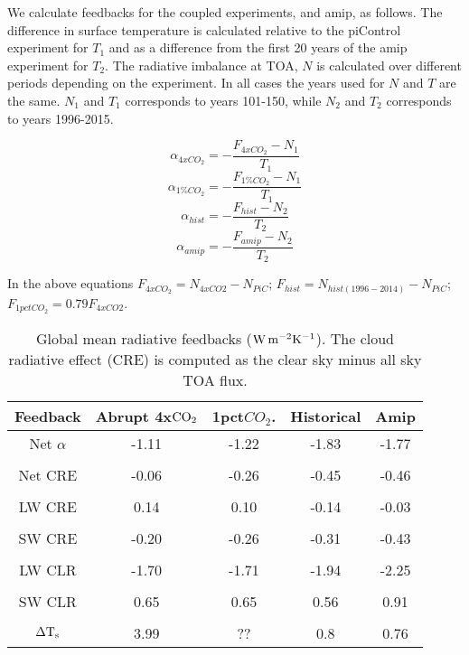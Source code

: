 \documentclass[draft]{agujournal2019}
\begin{document}
We calculate feedbacks for the coupled experiments, and amip, as follows.     The difference in surface temperature is calculated 
relative to the piControl experiment for $T_1$ and as a difference from the first 20 years of the amip experiment for $T_2$.   
The radiative imbalance at TOA, $N$ is calculated over different periods depending on the experiment.  In all cases
the years used for $N$ and $T$ are the same.  $N_1$ and $T_1$ corresponds to years 101-150, while $N_2$ and $T_2$ corresponds
to years 1996-2015.     

\begin{equation}
  \alpha_{4xCO_2}=-\frac{F_{4xCO_2}-N_1}{T_1}
\end{equation}
\begin{equation}
  \alpha_{1\%CO_2}=-\frac{F_{1\%CO_2}-N_1}{T_1}
\end{equation}
\begin{equation}
  \alpha_{hist}=-\frac{F_{hist}-N_2}{T_2}
\end{equation}
\begin{equation}
  \alpha_{amip}=-\frac{F_{amip}-N_2}{T_2}
\end{equation}

In the above equations $F_{4xCO_2}=N_{4xCO2}-N_{PiC}$; $F_{hist}=N_{hist(1996-2014)}-N_{PiC}$; 
$F_{1pctCO_2}=0.79F_{4xCO2}$.

\begin{table}
\begin{center}
\caption{Global mean radiative feedbacks ($\rm{W\, m^{-2} K^{-1}}$).  The cloud radiative effect (CRE) is computed as
 the clear sky minus all sky TOA flux.}
    \begin{tabular}{*{5}{c}}
    \hline
    \hline
 Feedback   & Abrupt 4x$\rm{CO}_2$ & 1pct$CO_2$.   & Historical    &  Amip   \\ \hline
    Net $\alpha$         &   -1.11      &  -1.22          &  -1.83         & -1.77               \\ 
    \\
    Net CRE   & -0.06       &  -0.26          & -0.45         & -0.46           \\  
    \\
    LW CRE   & 0.14        &  0.10            & -0.14           & -0.03          \\  
    \\
    SW CRE  & -0.20       &  -0.26            & -0.31          & -0.43         \\  
    \\
    LW CLR   & -1.70       &  -1.71            & -1.94           & -2.25        \\  
    \\
    SW CLR  & 0.65        & 0.65              & 0.56             & 0.91          \\  
    \\
    $\Delta \rm{T}_s$        & 3.99        &  ??                & 0.8              & 0.76          \\  \hline

    \end{tabular}\par
    \label{tab:lambda}
\end{center}
\end{table}
\end{document}
